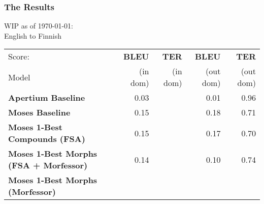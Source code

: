 \documentclass{beamer}
\begin{document}
\begin{frame}
    \frametitle{The Results}
    \begin{tiny}
    WIP as of \today: \\
    English to Finnish\\
        \begin{tabular}{|l|r|r||r|r|}
            \hline
            Score: & \bf BLEU & \bf TER  & \bf BLEU  & \bf TER   \\
            Model  & (in dom) & (in dom) & (out dom) & (out dom) \\ 
            \hline
            \bf Apertium Baseline      & 0.03 & & 0.01 & 0.96 \\
            \hline
            \bf Moses Baseline         & 0.15 & & 0.18 & 0.71 \\
            \hline
            \bf Moses 1-Best Compounds (FSA) & 0.15 & & 0.17 & 0.70 \\
            \hline
            \bf Moses 1-Best Morphs (FSA + Morfessor) & 0.14 & & 0.10 & 0.74 \\
            \hline
            \bf Moses 1-Best Morphs (Morfessor) & & & &  \\
            \hline
        \end{tabular}
    \end{tiny}
\end{frame}
\end{document}
